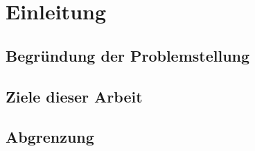 \section{Einleitung} %
\label{sec:einleitung}

\subsection{Begründung der Problemstellung} %
\label{sub:begrundung_der_problemstellung}


\subsection{Ziele dieser Arbeit} %
\label{sub:ziele_dieser_arbeit}


\subsection{Abgrenzung} %
\label{sub:abgrenzung}

\cite{gilchrist}


